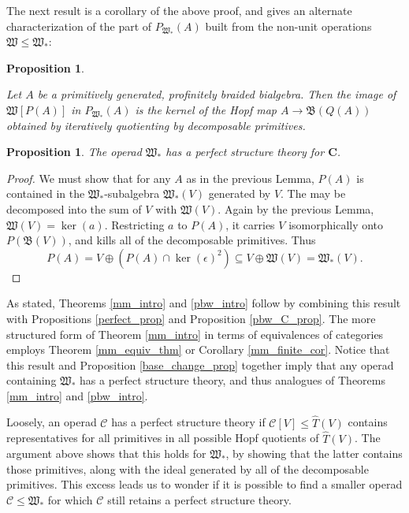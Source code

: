 \documentclass[12pt]{article}
\newcommand{\That}{\widehat{T}}
\newcommand{\CC} {\mathcal{C}}
\newcommand{\bC} {\mathbf{C}}
\newcommand{\mB}{\mathfrak{B}}
\newcommand{\mW}{\mathfrak{W}}
\theoremstyle{plain}
\newtheorem{prop}[thm]{Proposition}
\theoremstyle{definition}
\theoremstyle{remark}
\begin{document}
The next result is a corollary of the above proof, and gives an alternate characterization of the part of $P_{\mW_*}(A)$ built from the non-unit operations $\mW \leq \mW_*$:

\begin{prop} \label{alt_desc_prop}

Let $A$ be a primitively generated, profinitely braided  bialgebra.  Then the image of $\mW[P(A)]$ in $P_{\mW_*}(A)$ is the kernel of the Hopf map $A \to \mB(Q(A))$ obtained by iteratively quotienting by decomposable primitives.

\end{prop} 


\begin{prop}

The operad $\mW_*$ has a perfect structure theory for $\bC$.

\end{prop}

\begin{proof}

We must show that for any $A$ as in the previous Lemma, $P(A)$ is contained in the $\mW_*$-subalgebra $\mW_*(V)$ generated by $V$.  The may be decomposed into the sum of $V$ with $\mW(V)$.  Again by the previous Lemma, $\mW(V) = \ker(a)$.  Restricting $a$ to $P(A)$, it carries $V$ isomorphically onto $P(\mB(V))$, and kills all of the decomposable primitives.  Thus 
%
$$P(A) = V \oplus (P(A) \cap \ker(\epsilon)^2) \subseteq V \oplus \mW(V) = \mW_*(V).$$

\end{proof}

As stated, Theorems \ref{mm_intro} and \ref{pbw_intro} follow by combining this result with Propositions \ref{perfect_prop} and Proposition \ref{pbw_C_prop}.  The more structured form of Theorem \ref{mm_intro} in terms of equivalences of categories employs Theorem \ref{mm_equiv_thm} or Corollary \ref{mm_finite_cor}.  Notice that this result and Proposition \ref{base_change_prop} together imply that any operad containing $\mW_*$ has a perfect structure theory, and thus analogues of Theorems \ref{mm_intro} and \ref{pbw_intro}.

Loosely, an operad $\CC$ has a perfect structure theory if $\CC[V] \leq \That(V)$ contains representatives for all primitives in all possible Hopf quotients of $\That(V)$.  The argument above shows that this holds for $\mW_*$, by showing that the latter contains those primitives, along with the ideal generated by all of the decomposable primitives.  This excess leads us to wonder if it is possible to find a smaller operad $\CC \leq \mW_*$ for which $\CC$ still retains a perfect structure theory.  
\end{document}
